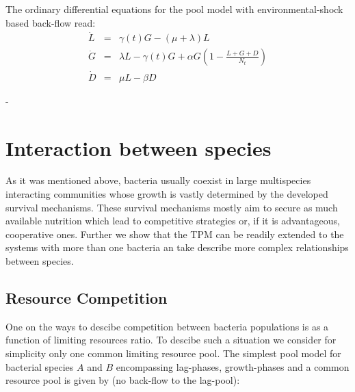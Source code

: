 \documentclass[10pt,A4paper]{article}
\begin{document}
The ordinary differential equations for the pool model with environmental-shock based back-flow read:
\begin{eqnarray}
\dot{L} &=&\gamma(t) G - (\mu + \lambda) L\\
\dot{G} &=& \lambda L -\gamma(t) G + \alpha G\left(1-\frac{L+G+D}{N_t}\right)\\
\dot{D} &=& \mu  L - \beta D
\end{eqnarray}

-  


\newpage

\section{Interaction between species}

As it was mentioned above, bacteria usually coexist in large multispecies interacting communities whose growth is vastly determined by the developed survival mechanisms.
These survival mechanisms mostly aim to secure as much available nutrition which lead to competitive strategies or, if it is advantageous, cooperative ones. \cite{hibbingBacterialCompetitionSurviving2010, stubbendieckBacterialCommunitiesInteractions2016} 
Further we show that the TPM can be readily extended to the systems with more than one bacteria an take describe more complex relationships between species. 


\subsection{Resource Competition}

One on the ways to descibe competition between bacteria populations is as a function of limiting resources ratio. 
To descibe such a situation we consider for simplicity only one common limiting resource pool. 
The simplest pool model for bacterial species $A$ and $B$ encompassing lag-phases, growth-phases and a common resource pool is given by (no back-flow to the lag-pool):
\end{document}
